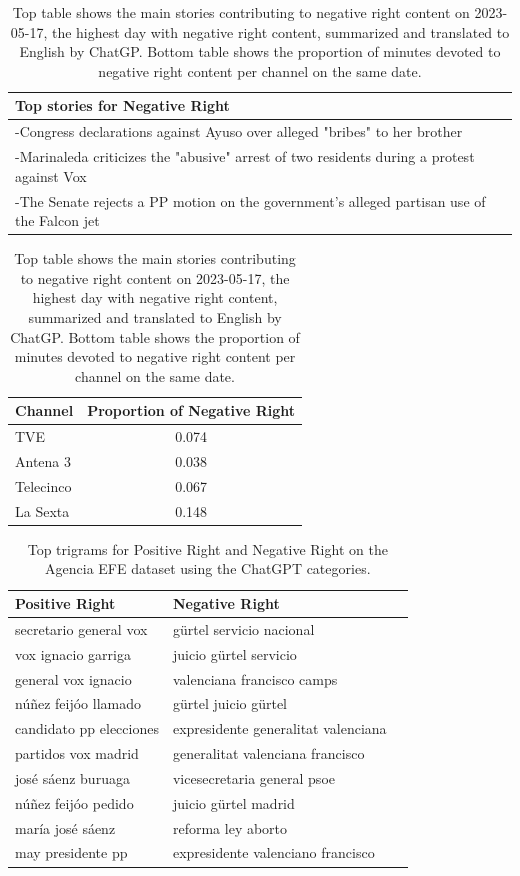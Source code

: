 \documentclass[12pt]{article}
\begin{document}
	
		\begin{table}[h]
		\centering
		\begin{tabular}{p{}}
			\toprule
			\textbf{Top stories for  Negative Right}  \\
			\midrule
			-Congress declarations against Ayuso over alleged "bribes" to her brother  \\
			-Marinaleda criticizes the "abusive" arrest of two residents during a protest against Vox  \\
			-The Senate rejects a PP motion on the government's alleged partisan use of the Falcon jet  \\
			\bottomrule
		\end{tabular}
	
		

		\begin{tabular}{l c}
			\toprule
			\textbf{Channel} & \textbf{Proportion of Negative Right} \\
			\midrule
			TVE & 0.074 \\
			Antena 3  & 0.038 \\
			Telecinco  & 0.067 \\
			La Sexta  & 0.148 \\
			\bottomrule
		\end{tabular}
		\caption{Top table shows the main stories contributing to negative right content on 2023-05-17, the highest day with negative right content,  summarized and translated to English by ChatGP. Bottom table shows the proportion of minutes devoted to negative right content per channel on the same date. }
		\label{tab:neg_right_channels}
	\end{table}
	
	
\begin{table}[ht]
	\centering
	\begin{tabular}{|l|l|l|}
		\hline
		Positive Right & Negative Right \\
		\hline
		secretario general vox & gürtel servicio nacional \\
		vox ignacio garriga & juicio gürtel servicio \\
		general vox ignacio & valenciana francisco camps \\
		núñez feijóo llamado & gürtel juicio gürtel \\
		candidato pp elecciones & expresidente generalitat valenciana \\
		partidos vox madrid & generalitat valenciana francisco \\
		josé sáenz buruaga & vicesecretaria general psoe \\
		núñez feijóo pedido & juicio gürtel madrid \\
		maría josé sáenz & reforma ley aborto \\
		may presidente pp & expresidente valenciano francisco \\
		\hline
	\end{tabular}
	\caption{Top trigrams for Positive Right and Negative Right on the Agencia EFE dataset using the ChatGPT categories.}
	\label{tab:top_words_pos_right_neg_right}
\end{table}
	
\end{document}
